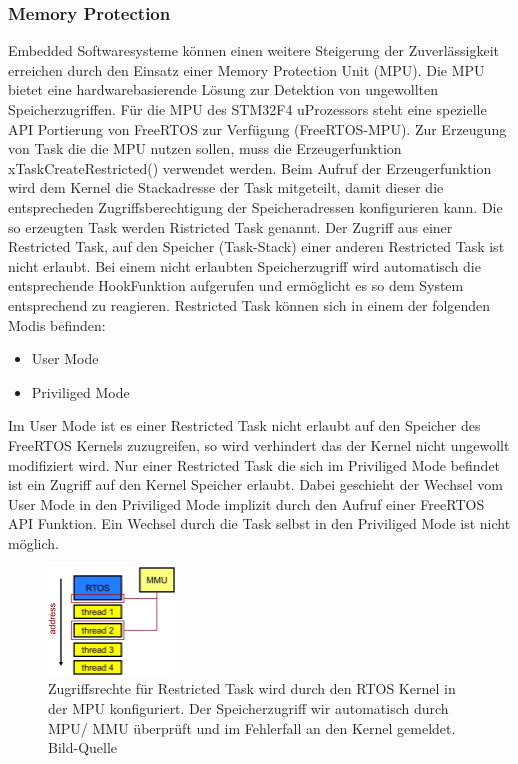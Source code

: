 \subsubsection{Memory Protection}
\label{sec:Memory Protection}
Embedded Softwaresysteme können einen weitere Steigerung der Zuverlässigkeit erreichen durch den Einsatz einer Memory Protection Unit (MPU). Die MPU bietet eine hardwarebasierende Lösung zur Detektion von ungewollten Speicherzugriffen. Für die MPU des STM32F4 uProzessors steht eine spezielle API Portierung von FreeRTOS zur Verfügung (FreeRTOS-MPU). Zur Erzeugung von Task die die MPU nutzen sollen, muss die Erzeugerfunktion xTaskCreateRestricted() verwendet werden. Beim Aufruf der Erzeugerfunktion wird dem Kernel die Stackadresse der Task mitgeteilt, damit dieser die entsprecheden Zugriffsberechtigung der Speicheradressen konfigurieren kann. Die so erzeugten Task werden Ristricted Task genannt. Der Zugriff aus einer Restricted Task, auf den Speicher (Task-Stack) einer anderen Restricted Task ist nicht erlaubt. Bei einem nicht erlaubten Speicherzugriff wird automatisch die entsprechende HookFunktion aufgerufen und ermöglicht es so dem System entsprechend zu reagieren. Restricted Task können sich in einem der folgenden Modis befinden:
\begin{itemize}
	\item User Mode
	\item Priviliged Mode 
\end{itemize}
Im User Mode ist es einer Restricted Task nicht erlaubt auf den Speicher des FreeRTOS Kernels zuzugreifen, so wird verhindert das der Kernel nicht ungewollt modifiziert wird. Nur einer Restricted Task die sich im Priviliged Mode befindet ist ein Zugriff auf den Kernel Speicher erlaubt. Dabei geschieht der Wechsel vom User Mode in den Priviliged Mode implizit durch den Aufruf einer FreeRTOS API Funktion. Ein Wechsel durch die Task selbst in den Priviliged Mode ist nicht möglich.
\begin{figure}[htb]
	\centering
		\includegraphics[width=0.3\textwidth]{Pictures/EmbeddedCom/addressSpaceMMU}
	\caption{Zugriffsrechte für Restricted Task wird durch den RTOS Kernel in der MPU konfiguriert. Der Speicherzugriff wir automatisch durch MPU/ MMU überprüft und im Fehlerfall an den Kernel gemeldet. Bild-Quelle~\protect{}}
	\label{fig:AddressSpaceMMU}
\end{figure} 
